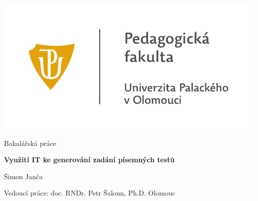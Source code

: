 \documentclass[11pt,a4paper]{report}
\begin{document}
	\begin{titlepage}
		\begin{center}
            {
                \centering
                \includegraphics[]{./files/img/UP_logo_PdF-UP_horizont_cz.pdf}

                \vspace{-5mm}
                \Large
            }

            \vspace{6cm}
			
			{
			    \Large
			    Bakalářská práce
                \vspace{4mm}
       
			    \textbf{\Huge Využití IT ke generování zadání písemných testů}
       
                \vspace{1cm}
                \LARGE
                Šimon Janča
            }

            \vfill
            
            {
                Vedoucí práce:
                doc. RNDr. Petr Šaloun, Ph.D.
                \hfill
    			Olomouc \the\year{}
            }
			
		\end{center}
	\end{titlepage}
    
    
    \thispagestyle{empty} %
    \null\vfill %
\end{document}
